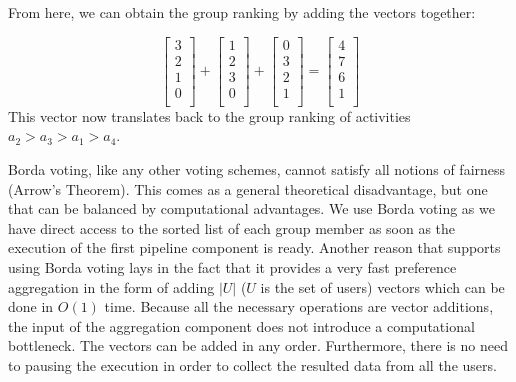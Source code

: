 \documentclass[11pt,a4paper,oneside]{article}
\begin{document}
From here, we can obtain the group ranking by adding the vectors together:

\begin{equation}
    \begin{bmatrix}
    3 \\
    2 \\
    1 \\
    0 \\
    \end{bmatrix} + 
    \begin{bmatrix}
    1 \\
    2 \\
    3 \\
    0 \\
    \end{bmatrix} + 
    \begin{bmatrix}
    0 \\
    3 \\
    2 \\
    1 \\
    \end{bmatrix} = 
    \begin{bmatrix}
    4 \\
    7 \\
    6 \\
    1 \\
    \end{bmatrix}
\end{equation}
This vector now translates back to the group ranking of activities $a_2 > a_3 > a_1 > a_4$.

Borda voting, like any other voting schemes, cannot satisfy all notions of fairness (Arrow's Theorem).\cite[pp. 260]{shohamMultiagentSystemsAlgorithmic} This comes as a general theoretical disadvantage, but one that can be balanced by computational advantages. We use Borda voting as we have direct access to the sorted list of each group member as soon as the execution of the first pipeline component is ready. Another reason that supports using Borda voting lays in the fact that it provides a very fast preference aggregation in the form of adding $|U|$ ($U$ is the set of users) vectors which can be done in $O(1)$ time. Because all the necessary operations are vector additions, the input of the aggregation component does not introduce a computational bottleneck. The vectors can be added in any order. Furthermore,  there is no need to pausing the execution in order to collect the resulted data from all the users.
\end{document}
